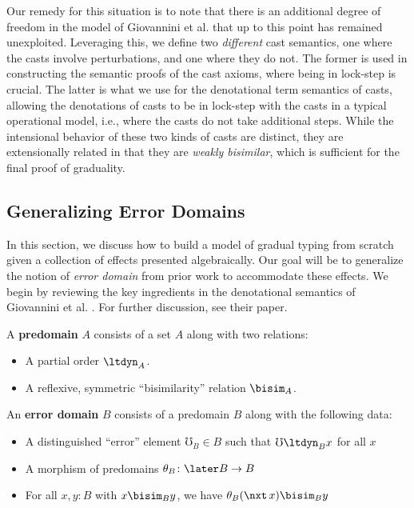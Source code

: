 \documentclass[acmsmall, screen]{acmart}
\theoremstyle{remark}
\begin{document}
Our remedy for this situation is to note that there is an additional degree of
freedom in the model of Giovannini et al. that up to this point has remained
unexploited. Leveraging this, we define two \emph{different} cast semantics, one
where the casts involve perturbations, and one where they do not. The former is
used in constructing the semantic proofs of the cast axioms, where being in
lock-step is crucial. The latter is what we use for the denotational term
semantics of casts, allowing the denotations of casts to be in lock-step with
the casts in a typical operational model, i.e., where the casts do not take
additional steps. While the intensional behavior of these two kinds of casts are
distinct, they are extensionally related in that they are \emph{weakly
bisimilar}, which is sufficient for the final proof of graduality.

\subsection{Generalizing Error Domains}

In this section, we discuss how to build a model of gradual typing from scratch
given a collection of effects presented algebraically. Our goal will be to
generalize the notion of \emph{error domain} from prior work to accommodate
these effects.
%
We begin by reviewing the key ingredients in the denotational semantics of
Giovannini et al. \cite{gtt-sgdt}. For further discussion, see their paper.

\begin{definition}
A \textbf{predomain} $A$ consists of a set $A$ along with two relations:
\begin{itemize}
    \item A partial order $\ltdyn_A$.
    \item A reflexive, symmetric ``bisimilarity'' relation $\bisim_A$.
\end{itemize}
\end{definition}

\begin{definition}
An \textbf{error domain} $B$ consists of a predomain $B$ along with the
following data:
\begin{itemize}
    \item A distinguished ``error'' element $\mho_B \in B$ such that $\mho
    \ltdyn_B x$ for all $x$
    \item A morphism of predomains $\theta_B \colon \later B \to B$
    \item For all $x, y : B$ with $x \bisim_B y$, we have $\theta_B(\nxt\, x)
    \bisim_B y$
\end{itemize}
\end{definition}
\end{document}
